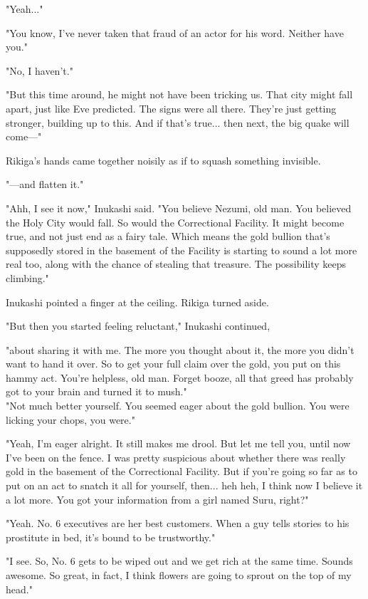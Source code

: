 "Yeah..."

"You know, I've never taken that fraud of an actor for his word. Neither
have you."

"No, I haven't."

"But this time around, he might not have been tricking us. That city
might fall apart, just like Eve predicted. The signs were all there.
They're just getting stronger, building up to this. And if that's
true... then next, the big quake will come---"

Rikiga's hands came together noisily as if to squash something
invisible.

"---and flatten it."

"Ahh, I see it now," Inukashi said. "You believe Nezumi, old man. You
believed the Holy City would fall. So would the Correctional Facility.
It might become true, and not just end as a fairy tale. Which means the
gold bullion that's supposedly stored in the basement of the Facility is
starting to sound a lot more real too, along with the chance of stealing
that treasure. The possibility keeps climbing."

Inukashi pointed a finger at the ceiling. Rikiga turned aside.

"But then you started feeling reluctant," Inukashi continued,~

"about sharing it with me. The more you thought about it, the more you
didn't want to hand it over. So to get your full claim over the gold,
you put on this hammy act. You're helpless, old man. Forget booze, all
that greed has probably got to your brain and turned it to mush."\\

"Not much better yourself. You seemed eager about the gold bullion. You
were licking your chops, you were."

"Yeah, I'm eager alright. It still makes me drool. But let me tell you,
until now I've been on the fence. I was pretty suspicious about whether
there was really gold in the basement of the Correctional Facility. But
if you're going so far as to put on an act to snatch it all for
yourself, then... heh heh, I think now I believe it a lot more. You got
your information from a girl named Suru, right?"

"Yeah. No. 6 executives are her best customers. When a guy tells stories
to his prostitute in bed, it's bound to be trustworthy."

"I see. So, No. 6 gets to be wiped out and we get rich at the same time.
Sounds awesome. So great, in fact, I think flowers are going to sprout
on the top of my head."

